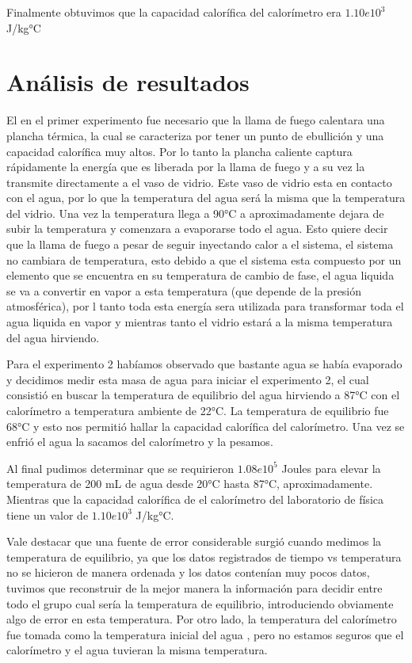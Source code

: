 \documentclass[journal,transmag]{IEEEtran}
\begin{document}
Finalmente obtuvimos que la capacidad calorífica del calorímetro era $ 1.10e10^3$  J/kg°C


\section{Análisis de resultados}
El en el primer experimento fue necesario que la llama de fuego calentara una plancha térmica, la cual se caracteriza por tener un punto de ebullición  y una capacidad calorífica muy altos. Por lo tanto la plancha caliente captura rápidamente la energía que es liberada por la llama de fuego y a su vez la transmite directamente a el vaso de vidrio. Este vaso de vidrio esta en contacto con el agua, por lo que la temperatura del agua será la misma que la temperatura del vidrio. Una vez la temperatura llega a 90°C a aproximadamente dejara de subir la temperatura y comenzara a evaporarse todo el agua. Esto quiere decir que la llama de fuego a pesar de seguir inyectando calor a el sistema, el sistema no cambiara de temperatura, esto debido a que el sistema esta compuesto por un elemento que se encuentra en su temperatura  de cambio de fase, el agua liquida se va a convertir en vapor a esta temperatura (que depende de la presión atmosférica), por l tanto toda esta energía sera utilizada para transformar toda el agua liquida en vapor y mientras tanto el vidrio estará a la misma temperatura del agua hirviendo.

Para el experimento 2 habíamos observado que bastante agua se había evaporado y decidimos medir esta masa de agua para iniciar el experimento 2, el cual consistió en buscar la temperatura de equilibrio del agua hirviendo a 87°C con el calorímetro a temperatura ambiente de 22°C. La temperatura de equilibrio fue 68°C y esto nos permitió hallar la capacidad calorífica del calorímetro. Una vez se enfrió el agua la sacamos del calorímetro y la pesamos.

Al final pudimos determinar que se requirieron $ 1.08e10^5$ Joules para elevar la temperatura de 200 mL de agua desde 20°C hasta 87°C, aproximadamente. Mientras que la capacidad calorífica de el calorímetro del laboratorio de física tiene un valor de $ 1.10e10^3$  J/kg°C.

Vale destacar que una fuente de error considerable surgió cuando medimos la temperatura de equilibrio, ya que los datos registrados de tiempo vs temperatura no se hicieron de manera ordenada y los datos contenían muy pocos datos, tuvimos que reconstruir de la mejor manera la información para decidir entre todo el grupo cual sería la temperatura de equilibrio, introduciendo obviamente algo de error en esta temperatura. Por otro lado, la temperatura del calorímetro fue tomada como la temperatura inicial del agua , pero no estamos seguros que el calorímetro y el agua tuvieran la misma temperatura.
\end{document}

